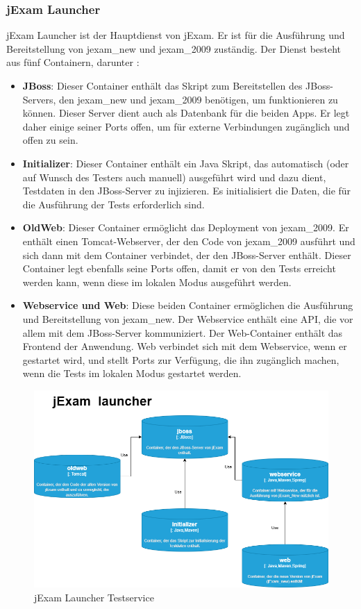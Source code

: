 \subsubsection{jExam Launcher}

jExam Launcher ist der Hauptdienst von jExam. Er ist für die Ausführung
und Bereitstellung von \gls{jexam_new} und \gls{jexam_2009} zuständig. Der Dienst
besteht aus fünf Containern, darunter :

\begin{itemize}
    \setlength\itemsep{1em}

    \item[] \textbf{JBoss}: Dieser Container enthält das Skript zum
    Bereitstellen des JBoss-Servers, den \gls{jexam_new} und \gls{jexam_2009}
    benötigen, um funktionieren zu können. Dieser Server dient auch
    als Datenbank für die beiden Apps. Er legt daher einige seiner
    Ports offen, um für externe Verbindungen zugänglich und offen
    zu sein.

    \item[] \textbf{Initializer}: Dieser Container enthält ein
    Java Skript, das automatisch (oder auf Wunsch des Testers auch
    manuell) ausgeführt wird und dazu dient, Testdaten in den 
    JBoss-Server zu injizieren. Es initialisiert die Daten, die für
    die Ausführung der Tests erforderlich sind.

    \item[] \textbf{OldWeb}: Dieser Container ermöglicht das
    Deployment von \gls{jexam_2009}. Er enthält einen Tomcat-Webserver,
    der den Code von \gls{jexam_2009} ausführt und sich dann mit
    dem Container verbindet, der den JBoss-Server enthält.
    Dieser Container legt ebenfalls seine Ports offen, damit er
    von den Tests erreicht werden kann, wenn diese im lokalen 
    Modus ausgeführt werden.

    \item[] \textbf{Webservice und Web}: Diese beiden Container
    ermöglichen die Ausführung und Bereitstellung von
    \gls{jexam_new}. Der Webservice enthält eine API, die vor
    allem mit dem JBoss-Server kommuniziert. Der Web-Container
    enthält das Frontend der Anwendung. Web verbindet sich mit
    dem Webservice, wenn er gestartet wird, und stellt Ports zur
    Verfügung, die ihn zugänglich machen, wenn die Tests im
    lokalen Modus gestartet werden.
\end{itemize}

\begin{figure}[H]
    \centering
    \includegraphics[scale=0.5]{images/launcher.drawio}
    \caption{jExam Launcher Testservice} \label{fig:laucher}
\end{figure}